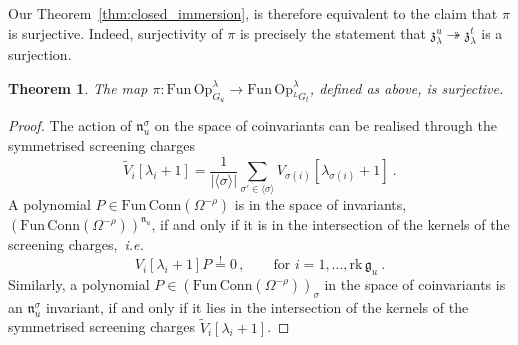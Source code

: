 \documentclass[a4paper]{article}
\newtheorem{thm}{Theorem}[section]
\def\gf{\mathfrak{g}}
\def \zf{\mathfrak{z}}
\def \ie{{\it i.e.}}
\begin{document}
Our Theorem~\ref{thm:closed_immersion}, is therefore equivalent to the claim that $\pi$ is surjective. Indeed, surjectivity of $\pi$ is precisely the statement that $\zf_\lambda^u \twoheadrightarrow \zf_\lambda^t$ is a surjection.
\begin{thm}
The map $\pi:\mathrm{Fun\, Op}_{G_u}^\lambda \rightarrow \mathrm{Fun\, Op}_{^LG_t}^\lambda$, defined as above, is surjective.
\end{thm}
\begin{proof}
The action of $\mathfrak{n}_u^\sigma$ on the space of coinvariants can be realised through the symmetrised screening charges
\begin{equation}
	\tilde{V}_i[\lambda_i +1] = \frac{1}{|\langle \sigma \rangle|} \sum_{\sigma'\in\langle \sigma \rangle} V_{\sigma(i)}[\lambda_{\sigma(i)}+1]~.
\end{equation}
A polynomial $P\in\mathrm{Fun\, Conn}(\Omega^{-\rho})$ is in the space of invariants, $(\mathrm{Fun\, Conn}(\Omega^{-\rho}))^{\mathfrak{n}_u}$, if and only if it is in the intersection of the kernels of the screening charges,~\ie
\begin{equation}
	V_i[\lambda_i +1]P \overset{!}= 0\,,\qquad \text{for } i=1,\dots,\mathrm{rk}\,\gf_u~.
\end{equation}
Similarly, a polynomial $P\in(\mathrm{Fun\, Conn}(\Omega^{-\rho}))_\sigma$ in the space of coinvariants is an $\mathfrak{n}_u^\sigma$ invariant, if and only if it lies in the intersection of the kernels of the symmetrised screening charges $\tilde{V}_i[\lambda_i+1]$.


\end{proof}
\end{document}
